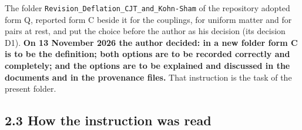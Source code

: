 \documentclass[
  10pt,
]{article}
\begin{document}
The folder \texttt{Revision\_Deflation\_CJT\_and\_Kohn-Sham} of the
repository adopted form Q, reported form C beside it for the couplings,
for uniform matter and for pairs at rest, and put the choice before the
author as his decision (its decision D1). \textbf{On 13 November 2026
the author decided: in a new folder form C is to be the definition; both
options are to be recorded correctly and completely; and the options are
to be explained and discussed in the documents and in the provenance
files.} That instruction is the task of the present folder.

\hypertarget{how-the-instruction-was-read}{%
\subsection{2.3 How the instruction was
read}\label{how-the-instruction-was-read}}
\end{document}
